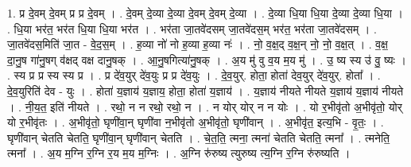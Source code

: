 \documentclass[17pt]{extarticle}
\begin{document}
1. प्र दे॒वम् दे॒वम् प्र प्र दे॒वम् । . दे॒वम् दे॒व्या दे॒व्या दे॒वम् दे॒वम् दे॒व्या । . दे॒व्या धि॒या धि॒या दे॒व्या दे॒व्या धि॒या । . धि॒या भर॑त॒ भर॑त धि॒या धि॒या भर॑त । . भर॑ता जा॒तवे॑दसम् जा॒तवे॑दस॒म् भर॑त॒ भर॑ता जा॒तवे॑दसम् । . जा॒तवे॑दस॒मिति॑ जा॒त - वे॒द॒स॒म् । . ह॒व्या नो॑ नो ह॒व्या ह॒व्या नः॑ । . नो॒ व॒क्ष॒द् व॒क्ष॒न् नो॒ नो॒ व॒क्ष॒त् । . व॒क्ष॒ दा॒नु॒ष गा॑नु॒षग् व॑क्षद् वक्ष दानु॒षक् । . आ॒नु॒षगित्या॑नु॒षक् । . अ॒य मु॑ वु व॒य म॒य मु॑ । . उ॒ ष्य स्य उ॑ वु॒ ष्यः । . स्य प्र प्र स्य स्य प्र । . प्र दे॑व॒युर् दे॑व॒युः प्र प्र दे॑व॒युः । . दे॒व॒युर्. होता॒ होता॑ देव॒युर् दे॑व॒युर्. होता᳚ । . दे॒व॒युरिति॑ देव - युः । . होता॑ य॒ज्ञाय॑ य॒ज्ञाय॒ होता॒ होता॑ य॒ज्ञाय॑ । . य॒ज्ञाय॑ नीयते नीयते य॒ज्ञाय॑ य॒ज्ञाय॑ नीयते । . नी॒य॒त॒ इति॑ नीयते । . रथो॒ न न रथो॒ रथो॒ न । . न योर् योर् न न योः । . यो र॒भीवृ॑तो अ॒भीवृ॑तो॒ योर् यो र॒भीवृ॑तः । . अ॒भीवृ॑तो॒ घृणी॑वा॒न् घृणी॑वा न॒भीवृ॑तो अ॒भीवृ॑तो॒ घृणी॑वान् । . अ॒भीवृ॑त॒ इत्य॒भि - वृ॒तः॒ । . घृणी॑वान् चेतति चेतति॒ घृणी॑वा॒न् घृणी॑वान् चेतति । . चे॒त॒ति॒ त्मना॒ त्मना॑ चेतति चेतति॒ त्मना᳚ । . त्मनेति॒ त्मना᳚ । . अ॒य म॒ग्नि र॒ग्नि र॒य म॒य म॒ग्निः । . अ॒ग्नि रु॑रुष्य त्युरुष्य त्य॒ग्नि र॒ग्नि रु॑रुष्यति । \newline
\end{document}
